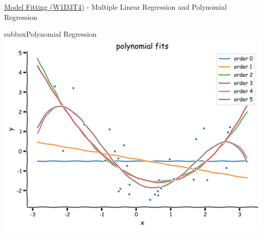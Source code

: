 \begin{textbox}{\href{https://compneuro.neuromatch.io/tutorials/W1D3_ModelFitting/student/W1D3_Tutorial4.html}{Model Fitting (W1D3T4)} -  Multiple Linear Regression and Polynomial Regression}
\begin{subbox}{subbox}{Polynomial Regression}
\centering
\includegraphics[scale=0.1]{Figures/ModelFitting/MFFigure4.png}
\end{subbox}
\end{textbox}
